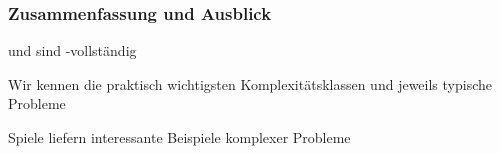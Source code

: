 \documentclass[aspectratio=1610,onlymath]{beamer}
\begin{document}
\begin{frame}\frametitle{Zusammenfassung und Ausblick}

 und  sind \PSpace-vollständig
\bigskip

Wir kennen die praktisch wichtigsten Komplexitätsklassen und jeweils typische Probleme
\bigskip

Spiele liefern interessante Beispiele komplexer Probleme
\bigskip


\end{frame}



% 
% 
% 
% 
% 
% 
\end{document}
